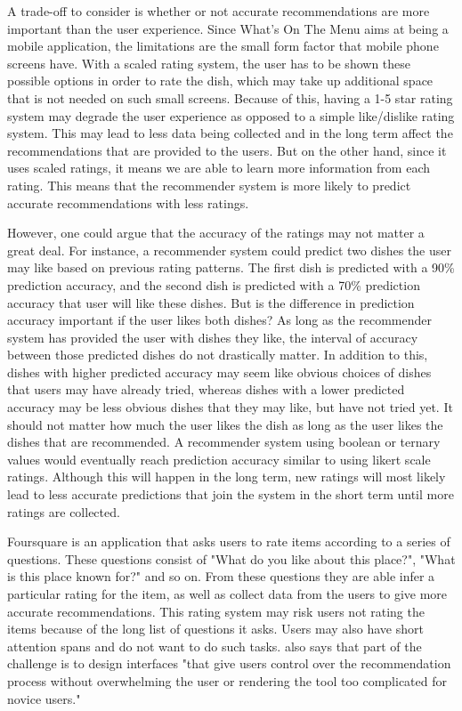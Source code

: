 A trade-off to consider is whether or not accurate recommendations are more important than the user experience. Since What's On The Menu aims at being a mobile application, the limitations are the small form factor that mobile phone screens have. With a scaled rating system, the user has to be shown these possible options in order to rate the dish, which may take up additional space that is not needed on such small screens. Because of this, having a 1-5 star rating system may degrade the user experience as opposed to a simple like/dislike rating system. This may lead to less data being collected and in the long term affect the recommendations that are provided to the users. But on the other hand, since it uses scaled ratings, it means we are able to learn more information from each rating. This means that the recommender system is more likely to predict accurate recommendations with less ratings. 

However, one could argue that the accuracy of the ratings may not matter a great deal. For instance, a recommender system could predict two dishes the user  may like based on previous rating patterns. The first dish is predicted with a 90\% prediction accuracy, and the second dish is predicted with a 70\% prediction accuracy that user will like these dishes. But is the difference in prediction accuracy important if the user likes both dishes? As long as the recommender system has provided the user with dishes they like, the interval of accuracy between those predicted dishes do not drastically matter. In addition to this, dishes with higher predicted accuracy may seem like obvious choices of dishes that users may have already tried, whereas dishes with a lower predicted accuracy may be less obvious dishes that they may like, but have not tried yet. It should not matter how much the user likes the dish as long as the user likes the dishes that are recommended. A recommender system using boolean or ternary values would eventually reach prediction accuracy similar to using likert scale ratings. Although this will happen in the long term, new ratings will most likely lead to less accurate predictions that join the system in the short term until more ratings are collected. 

Foursquare is an application that asks users to rate items according to a series of questions. These questions consist of "What do you like about this place?", "What is this place known for?" and so on. From these questions they are able infer a particular rating for the item, as well as collect data from the users to give more accurate recommendations. This rating system may risk users not rating the items because of the long list of questions it asks. Users may also have short attention spans and do not want to do such tasks. \cite{martin2009recsys} also says that part of the challenge is to design interfaces "that give users control over the recommendation process without overwhelming the user or rendering the tool too complicated for novice users." 

